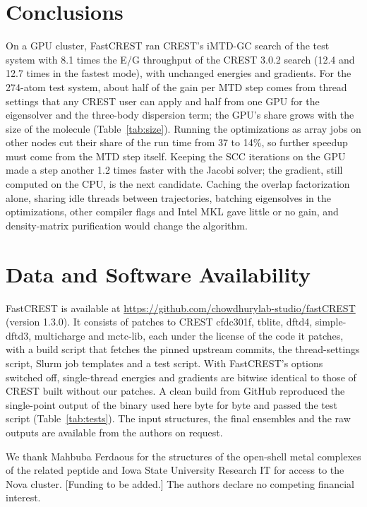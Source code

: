 \documentclass[journal=jctcce,manuscript=article]{achemso}
\begin{document}
\section{Conclusions}

On a GPU cluster, FastCREST ran CREST's iMTD-GC search of the test system with 8.1 times the E/G throughput of the CREST 3.0.2 search (12.4 and 12.7 times in the fastest mode), with unchanged energies and gradients. For the 274-atom test system, about half of the gain per MTD step comes from thread settings that any CREST user can apply and half from one GPU for the eigensolver and the three-body dispersion term; the GPU's share grows with the size of the molecule (Table~\ref{tab:size}). Running the optimizations as array jobs on other nodes cut their share of the run time from 37 to 14\%, so further speedup must come from the MTD step itself. Keeping the SCC iterations on the GPU made a step another 1.2 times faster with the Jacobi solver; the gradient, still computed on the CPU, is the next candidate. Caching the overlap factorization alone, sharing idle threads between trajectories, batching eigensolves in the optimizations, other compiler flags and Intel MKL gave little or no gain, and density-matrix purification would change the algorithm.

\section*{Data and Software Availability}

FastCREST is available at \url{https://github.com/chowdhurylab-studio/fastCREST} (version 1.3.0). It consists of patches to CREST cfdc301f,\cite{crestcfdc301f} tblite,\cite{tblite} dftd4,\cite{dftd4code} simple-dftd3,\cite{sdftd3code} multicharge\cite{multichargecode} and mctc-lib,\cite{mctclib} each under the license of the code it patches, with a build script that fetches the pinned upstream commits, the thread-settings script, Slurm job templates and a test script. With FastCREST's options switched off, single-thread energies and gradients are bitwise identical to those of CREST built without our patches. A clean build from GitHub reproduced the single-point output of the binary used here byte for byte and passed the test script (Table~\ref{tab:tests}). The input structures, the final ensembles and the raw outputs are available from the authors on request.

\begin{acknowledgement}
We thank Mahbuba Ferdaous for the structures of the open-shell metal complexes of the related peptide and Iowa State University Research IT for access to the Nova cluster. [Funding to be added.] The authors declare no competing financial interest.
\end{acknowledgement}
\end{document}
